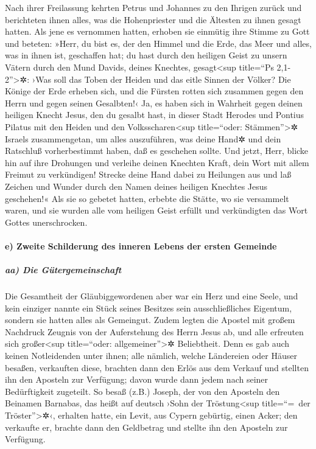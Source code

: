  Nach ihrer Freilassung kehrten Petrus und Johannes zu
den Ihrigen zurück und berichteten ihnen alles, was die Hohenpriester
und die Ältesten zu ihnen gesagt hatten.  Als jene es
vernommen hatten, erhoben sie einmütig ihre Stimme zu Gott und beteten:
»Herr, du bist es, der den Himmel und die Erde, das Meer und alles, was
in ihnen ist, geschaffen hat;  du hast durch den heiligen
Geist zu unsern Vätern durch den Mund Davids, deines Knechtes,
gesagt\textless sup title=``Ps 2,1-2''\textgreater✲: ›Was soll das Toben
der Heiden und das eitle Sinnen der Völker?  Die Könige
der Erde erheben sich, und die Fürsten rotten sich zusammen gegen den
Herrn und gegen seinen Gesalbten!‹  Ja, es haben sich in
Wahrheit gegen deinen heiligen Knecht Jesus, den du gesalbt hast, in
dieser Stadt Herodes und Pontius Pilatus mit den Heiden und den
Volksscharen\textless sup title=``oder: Stämmen''\textgreater✲ Israels
zusammengetan,  um alles auszuführen, was deine Hand✲ und
dein Ratschluß vorherbestimmt haben, daß es geschehen sollte.
 Und jetzt, Herr, blicke hin auf ihre Drohungen und
verleihe deinen Knechten Kraft, dein Wort mit allem Freimut zu
verkündigen!  Strecke deine Hand dabei zu Heilungen aus
und laß Zeichen und Wunder durch den Namen deines heiligen Knechtes
Jesus geschehen!«  Als sie so gebetet hatten, erbebte die
Stätte, wo sie versammelt waren, und sie wurden alle vom heiligen Geist
erfüllt und verkündigten das Wort Gottes unerschrocken.

\hypertarget{e-zweite-schilderung-des-inneren-lebens-der-ersten-gemeinde}{%
\paragraph{e) Zweite Schilderung des inneren Lebens der ersten
Gemeinde}\label{e-zweite-schilderung-des-inneren-lebens-der-ersten-gemeinde}}

\hypertarget{aa-die-guxfctergemeinschaft}{%
\subparagraph{aa) Die
Gütergemeinschaft}\label{aa-die-guxfctergemeinschaft}}

 Die Gesamtheit der Gläubiggewordenen aber war ein Herz
und eine Seele, und kein einziger nannte ein Stück seines Besitzes sein
ausschließliches Eigentum, sondern sie hatten alles als Gemeingut.
 Zudem legten die Apostel mit großem Nachdruck Zeugnis
von der Auferstehung des Herrn Jesus ab, und alle erfreuten sich
großer\textless sup title=``oder: allgemeiner''\textgreater✲
Beliebtheit.  Denn es gab auch keinen Notleidenden unter
ihnen; alle nämlich, welche Ländereien oder Häuser besaßen, verkauften
diese, brachten dann den Erlös aus dem Verkauf  und
stellten ihn den Aposteln zur Verfügung; davon wurde dann jedem nach
seiner Bedürftigkeit zugeteilt.  So besaß (z.B.) Joseph,
der von den Aposteln den Beinamen Barnabas, das heißt auf deutsch ›Sohn
der Tröstung\textless sup title=``=~der Tröster''\textgreater✲‹,
erhalten hatte, ein Levit, aus Cypern gebürtig, einen Acker;
 den verkaufte er, brachte dann den Geldbetrag und
stellte ihn den Aposteln zur Verfügung.

